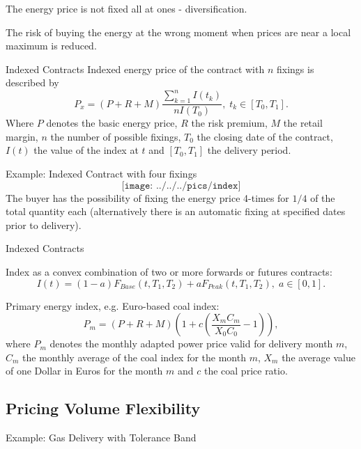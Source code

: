 



	The energy price is not fixed all at ones - diversification.


	The risk of buying the energy at the wrong moment when prices are near a local maximum is reduced.





{Indexed Contracts}
Indexed energy price of the contract with $n$ fixings is described by
$$P_x=(P+R+M)\frac{\sum_{k=1}^n{I(t_k)}}{nI(T_0)},\;t_k\in[T_0,T_1].$$
Where $P$ denotes the basic energy price, $R$ the risk premium, $M$ the retail margin, $n$ the number of possible fixings,
$T_0$ the closing date of the contract, $I(t)$ the value of the index at $t$ and $[T_0,T_1]$ the delivery period.

{Example: Indexed Contract with four fixings}
$$\texttt{[image: ../../../pics/index]}$$
The buyer has the possibility of fixing the energy price 4-times for $1/4$ of the total quantity each (alternatively there is an automatic fixing at specified dates prior to delivery).

{Indexed Contracts}






	Index as a convex combination of two or more forwards or futures contracts:
  $$I(t)=(1-a)F_{Base}(t,T_1,T_2)+aF_{Peak}(t,T_1,T_2),\;a\in[0,1].$$


	Primary energy index, e.g. Euro-based coal index:
  $$P_m=(P+R+M)\left(1+c\left(\frac{X_mC_m}{X_0C_0}-1\right)\right),$$
  where $P_m$ denotes the monthly adapted power price valid for delivery month $m$, $C_m$ the monthly average of the coal index for the month $m$, $X_m$ the average value of one Dollar in Euros for the month $m$ and $c$ the coal price ratio.





\subsection{Pricing Volume Flexibility}

{Example: Gas Delivery with Tolerance Band}


